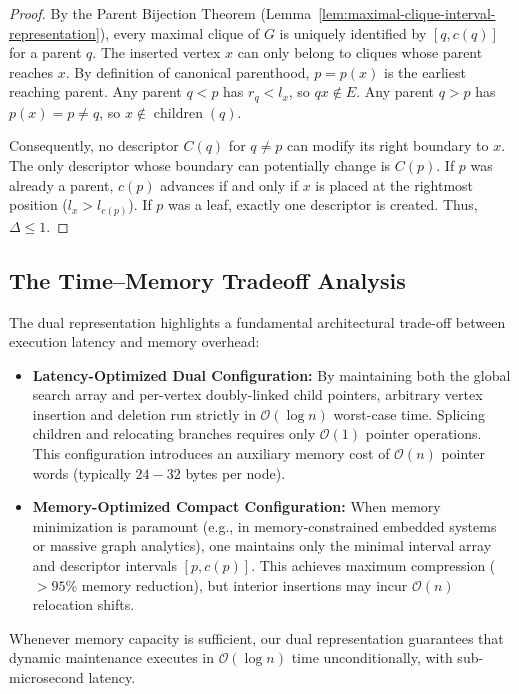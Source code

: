 \begin{proof}
By the Parent Bijection Theorem (Lemma~\ref{lem:maximal-clique-interval-representation}), every maximal clique of $G$ is uniquely identified by $[q, c(q)]$ for a parent $q$. The inserted vertex $x$ can only belong to cliques whose parent reaches $x$. By definition of canonical parenthood, $p = p(x)$ is the earliest reaching parent. Any parent $q < p$ has $r_q < l_x$, so $q x \notin E$. Any parent $q > p$ has $p(x) = p \ne q$, so $x \notin \operatorname{children}(q)$. 

Consequently, no descriptor $C(q)$ for $q \ne p$ can modify its right boundary to $x$. The only descriptor whose boundary can potentially change is $C(p)$. If $p$ was already a parent, $c(p)$ advances if and only if $x$ is placed at the rightmost position ($l_x > l_{c(p)}$). If $p$ was a leaf, exactly one descriptor is created. Thus, $\Delta \le 1$.
\end{proof}

\subsection{The Time--Memory Tradeoff Analysis}
\label{sec:memory_time_tradeoff}

The dual representation highlights a fundamental architectural trade-off between execution latency and memory overhead:
\begin{itemize}
    \item \textbf{Latency-Optimized Dual Configuration:} By maintaining both the global search array and per-vertex doubly-linked child pointers, arbitrary vertex insertion and deletion run strictly in $\mathcal{O}(\log n)$ worst-case time. Splicing children and relocating branches requires only $\mathcal{O}(1)$ pointer operations. This configuration introduces an auxiliary memory cost of $\mathcal{O}(n)$ pointer words (typically $24 - 32$ bytes per node).
    \item \textbf{Memory-Optimized Compact Configuration:} When memory minimization is paramount (e.g., in memory-constrained embedded systems or massive graph analytics), one maintains only the minimal interval array and descriptor intervals $[p, c(p)]$. This achieves maximum compression ($>95\%$ memory reduction), but interior insertions may incur $\mathcal{O}(n)$ relocation shifts.
\end{itemize}
Whenever memory capacity is sufficient, our dual representation guarantees that dynamic maintenance executes in $\mathcal{O}(\log n)$ time unconditionally, with sub-microsecond latency.

